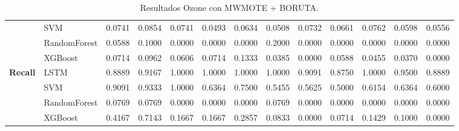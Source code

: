 \begin{table}[h]
\begin{adjustbox}{max width=15cm}
\begin{tabular}{|c|l|r|r|r|r|r|r|r|r|r|r|r|}
			& SVM &  0.0741 &  0.0854 &  0.0741 &  0.0493 &  0.0634 &  0.0508 &  0.0732 &  0.0661 &  0.0762 &  0.0598 &  0.0556 \\
			& RandomForest &  0.0588 &  0.1000 &  0.0000 &  0.0000 &  0.0000 &  0.2000 &  0.0000 &  0.0000 &  0.0000 &  0.0000 &  0.0000 \\
			& XGBoost &  0.0714 &  0.0962 &  0.0606 &  0.0714 &  0.1333 &  0.0385 &  0.0000 &  0.0588 &  0.0455 &  0.0370 &  0.0000 \\
			\hline
			\textbf{Recall} & LSTM &  0.8889 &  0.9167 &  1.0000 &  1.0000 &  1.0000 &  1.0000 &  0.9091 &  0.8750 &  1.0000 &  0.9500 &  0.8889 \\
			& SVM &  0.9091 &  0.9333 &  1.0000 &  0.6364 &  0.7500 &  0.5455 &  0.5625 &  0.5000 &  0.6154 &  0.6364 &  0.6000 \\
			& RandomForest &  0.0769 &  0.0769 &  0.0000 &  0.0000 &  0.0000 &  0.0769 &  0.0000 &  0.0000 &  0.0000 &  0.0000 &  0.0000 \\
			& XGBoost &  0.4167 &  0.7143 &  0.1667 &  0.1667 &  0.2857 &  0.0833 &  0.0000 &  0.0714 &  0.1429 &  0.1000 &  0.0000 \\
			\hline
		\end{tabular}
	\end{adjustbox}
	\caption{Resultados Ozone con MWMOTE + BORUTA.}
	\label{tab:Ozone_MWMOTE_BORUTA}
\end{table}
\newpage
